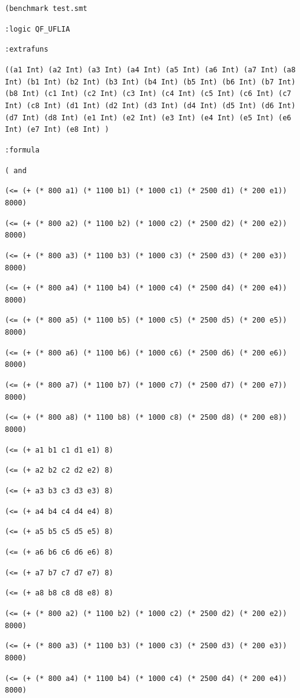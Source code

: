 \documentclass[12pt]{article}
\begin{document}
 {\footnotesize

{\tt  (benchmark test.smt }

{\tt  :logic QF\_UFLIA }

{\tt  :extrafuns }

{\tt  ((a1 Int) (a2 Int) (a3 Int) (a4 Int) (a5 Int) (a6 Int) (a7 Int) (a8 Int) (b1 Int) (b2 Int) (b3 Int) (b4 Int) (b5 Int) (b6 Int) (b7 Int) (b8 Int) (c1 Int) (c2 Int) (c3 Int) (c4 Int) (c5 Int) (c6 Int) (c7 Int) (c8 Int)  (d1 Int) (d2 Int) (d3 Int) (d4 Int) (d5 Int) (d6 Int) (d7 Int) (d8 Int)  (e1 Int) (e2 Int) (e3 Int) (e4 Int) (e5 Int) (e6 Int) (e7 Int) (e8 Int) ) }

{\tt  :formula }

{\tt  ( and  }

{\tt  (<= (+ (* 800 a1) (* 1100 b1) (* 1000 c1) (* 2500 d1) (* 200 e1)) 8000) }

{\tt  (<= (+ (* 800 a2) (* 1100 b2) (* 1000 c2) (* 2500 d2) (* 200 e2)) 8000) }

{\tt  (<= (+ (* 800 a3) (* 1100 b3) (* 1000 c3) (* 2500 d3) (* 200 e3)) 8000) }

{\tt  (<= (+ (* 800 a4) (* 1100 b4) (* 1000 c4) (* 2500 d4) (* 200 e4)) 8000) }

{\tt  (<= (+ (* 800 a5) (* 1100 b5) (* 1000 c5) (* 2500 d5) (* 200 e5)) 8000) }

{\tt  (<= (+ (* 800 a6) (* 1100 b6) (* 1000 c6) (* 2500 d6) (* 200 e6)) 8000) }

{\tt  (<= (+ (* 800 a7) (* 1100 b7) (* 1000 c7) (* 2500 d7) (* 200 e7)) 8000) }

{\tt  (<= (+ (* 800 a8) (* 1100 b8) (* 1000 c8) (* 2500 d8) (* 200 e8)) 8000) }

{\tt  (<= (+ a1 b1 c1 d1 e1) 8) }

{\tt  (<= (+ a2 b2 c2 d2 e2) 8) }

{\tt  (<= (+ a3 b3 c3 d3 e3) 8) }

{\tt  (<= (+ a4 b4 c4 d4 e4) 8) }

{\tt  (<= (+ a5 b5 c5 d5 e5) 8) }

{\tt  (<= (+ a6 b6 c6 d6 e6) 8) }

{\tt  (<= (+ a7 b7 c7 d7 e7) 8) }

{\tt  (<= (+ a8 b8 c8 d8 e8) 8) }

{\tt  (<= (+ (* 800 a2) (* 1100 b2) (* 1000 c2) (* 2500 d2) (* 200 e2)) 8000) }

{\tt  (<= (+ (* 800 a3) (* 1100 b3) (* 1000 c3) (* 2500 d3) (* 200 e3)) 8000) }

{\tt  (<= (+ (* 800 a4) (* 1100 b4) (* 1000 c4) (* 2500 d4) (* 200 e4)) 8000) }

}
\end{document}
